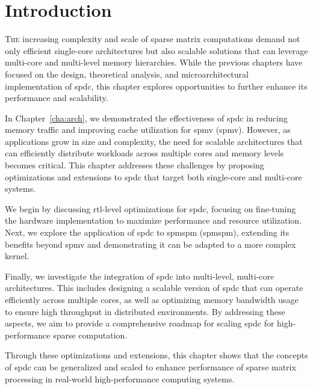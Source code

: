 
\section{Introduction}
\label{sec:optim:intro}

\lettrine{T}{he} increasing complexity and scale of sparse matrix computations demand not only efficient single-core architectures but also scalable solutions that can leverage multi-core and multi-level memory hierarchies.
While the previous chapters have focused on the design, theoretical analysis, and microarchitectural implementation of \acrlong{spdc}, this chapter explores opportunities to further enhance its performance and scalability.

In Chapter~\ref{cha:arch}, we demonstrated the effectiveness of \acrlong{spdc} in reducing memory traffic and improving cache utilization for \acrlong{spmv} (\acrshort{spmv}).
However, as applications grow in size and complexity, the need for scalable architectures that can efficiently distribute workloads across multiple cores and memory levels becomes critical.
This chapter addresses these challenges by proposing optimizations and extensions to \acrlong{spdc} that target both single-core and multi-core systems.

We begin by discussing \acrshort{rtl}-level optimizations for \acrlong{spdc}, focusing on fine-tuning the hardware implementation to maximize performance and resource utilization.
Next, we explore the application of \acrlong{spdc} to \acrlong{spmspm} (\acrshort{spmspm}), extending its benefits beyond \acrshort{spmv} and demonstrating it can be adapted to a more complex kernel.

Finally, we investigate the integration of \acrlong{spdc} into multi-level, multi-core architectures.
This includes designing a scalable version of \acrlong{spdc} that can operate efficiently across multiple cores, as well as optimizing memory bandwidth usage to ensure high throughput in distributed environments.
By addressing these aspects, we aim to provide a comprehensive roadmap for scaling \acrlong{spdc} for high-performance sparse computation.

Through these optimizations and extensions, this chapter shows that the concepts of \acrlong{spdc} can be generalized and scaled to enhance performance of sparse matrix processing in real-world high-performance computing systems.